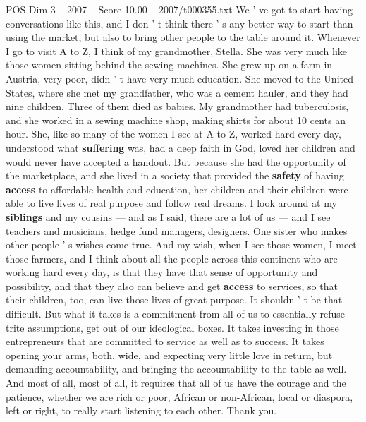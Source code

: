 \begin{textsample}{POS Dim 3 – 2007 – Score 10.00 – 2007/t000355.txt}
We ' ve got to start having conversations like this, and I don ' t think there ' s any better way to start than using the market, but also to bring other people to the table around it.
Whenever I go to visit A to Z, I think of my grandmother, Stella.
She was very much like those women sitting behind the sewing machines.
She grew up on a farm in Austria, very poor, didn ' t have very much education.
She moved to the United States, where she met my grandfather, who was a cement hauler, and they had nine children.
Three of them died as babies.
My grandmother had tuberculosis, and she worked in a sewing machine shop, making shirts for about 10 cents an hour.
She, like so many of the women I see at A to Z, worked hard every day, understood what \textbf{suffering} was, had a deep faith in God, loved her children and would never have accepted a handout.
But because she had the opportunity of the marketplace, and she lived in a society that provided the \textbf{safety} of having \textbf{access} to affordable health and education, her children and their children were able to live lives of real purpose and follow real dreams.
I look around at my \textbf{siblings} and my cousins — and as I said, there are a lot of us — and I see teachers and musicians, hedge fund managers, designers.
One sister who makes other people ' s wishes come true.
And my wish, when I see those women, I meet those farmers, and I think about all the people across this continent who are working hard every day, is that they have that sense of opportunity and possibility, and that they also can believe and get \textbf{access} to services, so that their children, too, can live those lives of great purpose.
It shouldn ' t be that difficult.
But what it takes is a commitment from all of us to essentially refuse trite assumptions, get out of our ideological boxes.
It takes investing in those entrepreneurs that are committed to service as well as to success.
It takes opening your arms, both, wide, and expecting very little love in return, but demanding accountability, and bringing the accountability to the table as well.
And most of all, most of all, it requires that all of us have the courage and the patience, whether we are rich or poor, African or non-African, local or diaspora, left or right, to really start listening to each other.
Thank you.

\end{textsample}
